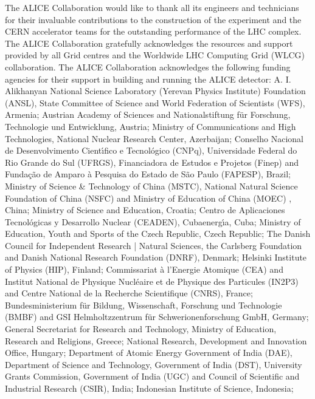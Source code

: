 
The ALICE Collaboration would like to thank all its engineers and technicians for their invaluable contributions to the construction of the experiment and the CERN accelerator teams for the outstanding performance of the LHC complex.
%
The ALICE Collaboration gratefully acknowledges the resources and support provided by all Grid centres and the Worldwide LHC Computing Grid (WLCG) collaboration.
%
The ALICE Collaboration acknowledges the following funding agencies for their support in building and running the ALICE detector:
%
A. I. Alikhanyan National Science Laboratory (Yerevan Physics Institute) Foundation (ANSL), State Committee of Science and World Federation of Scientists (WFS), Armenia;
%
Austrian Academy of Sciences and Nationalstiftung f\"{u}r Forschung, Technologie und Entwicklung, Austria;
%
Ministry of Communications and High Technologies, National Nuclear Research Center, Azerbaijan;
%
Conselho Nacional de Desenvolvimento Cient\'{\i}fico e Tecnol\'{o}gico (CNPq), Universidade Federal do Rio Grande do Sul (UFRGS), Financiadora de Estudos e Projetos (Finep) and Funda\c{c}\~{a}o de Amparo \`{a} Pesquisa do Estado de S\~{a}o Paulo (FAPESP), Brazil;
%
Ministry of Science \& Technology of China (MSTC), National Natural Science Foundation of China (NSFC) and Ministry of Education of China (MOEC) , China;
%
Ministry of Science and Education, Croatia;
%
Centro de Aplicaciones Tecnol\'{o}gicas y Desarrollo Nuclear (CEADEN), Cubaenerg\'{\i}a, Cuba;
%
Ministry of Education, Youth and Sports of the Czech Republic, Czech Republic;
%
The Danish Council for Independent Research | Natural Sciences, the Carlsberg Foundation and Danish National Research Foundation (DNRF), Denmark;
%
Helsinki Institute of Physics (HIP), Finland;
%
Commissariat \`{a} l'Energie Atomique (CEA) and Institut National de Physique Nucl\'{e}aire et de Physique des Particules (IN2P3) and Centre National de la Recherche Scientifique (CNRS), France;
%
Bundesministerium f\"{u}r Bildung, Wissenschaft, Forschung und Technologie (BMBF) and GSI Helmholtzzentrum f\"{u}r Schwerionenforschung GmbH, Germany;
%
General Secretariat for Research and Technology, Ministry of Education, Research and Religions, Greece;
%
National Research, Development and Innovation Office, Hungary;
%
Department of Atomic Energy Government of India (DAE), Department of Science and Technology, Government of India (DST), University Grants Commission, Government of India (UGC) and Council of Scientific and Industrial Research (CSIR), India;
%
Indonesian Institute of Science, Indonesia;
